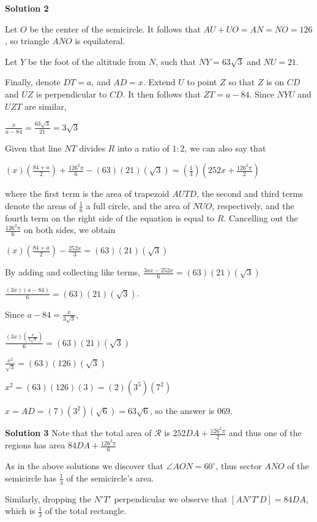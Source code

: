 \documentclass[a4paper,11pt]{article}
\begin{document}
\textbf{Solution 2}

Let $O$ be the center of the semicircle. It follows that $AU + UO = AN = NO = 126$, so triangle $ANO$ is equilateral.

Let $Y$ be the foot of the altitude from $N$, such that $NY = 63\sqrt{3}$ and $NU = 21$.

Finally, denote $DT = a$, and $AD = x$. Extend $U$ to point $Z$ so that $Z$ is on $CD$ and $UZ$ is perpendicular to $CD$. It then follows that $ZT = a-84$. Since $NYU$ and $UZT$ are similar,

$\frac {x}{a-84} = \frac {63\sqrt{3}}{21} = 3\sqrt{3}$

Given that line $NT$ divides $R$ into a ratio of $1:2$, we can also say that

$(x)(\frac{84+a}{2}) + \frac {126^2\pi}{6} - (63)(21)(\sqrt{3}) = (\frac{1}{3})(252x + \frac{126^2\pi}{2})$

where the first term is the area of trapezoid $AUTD$, the second and third terms denote the areas of $\frac{1}{6}$ a full circle, and the area of $NUO$, respectively, and the fourth term on the right side of the equation is equal to $R$. Cancelling out the $\frac{126^2\pi}{6}$ on both sides, we obtain

$(x)(\frac{84+a}{2}) - \frac{252x}{3} = (63)(21)(\sqrt{3})$

By adding and collecting like terms, $\frac{3ax - 252x}{6} = (63)(21)(\sqrt{3})$

$\frac{(3x)(a-84)}{6} = (63)(21)(\sqrt{3})$.

Since $a - 84 = \frac{x}{3\sqrt{3}}$,

$\frac {(3x)(\frac{x}{3\sqrt{3}})}{6} = (63)(21)(\sqrt{3})$

$\frac {x^2}{\sqrt{3}} = (63)(126)(\sqrt{3})$

$x^2 = (63)(126)(3) = (2)(3^5)(7^2)$

$x = AD = (7)(3^2)(\sqrt{6}) = 63\sqrt{6}$, so the answer is $\boxed{069}.$


\textbf{Solution 3}
Note that the total area of $\mathcal{R}$ is $252DA + \frac {126^2 \pi}{2}$ and thus one of the regions has area $84DA + \frac {126^2 \pi}{6}$

As in the above solutions we discover that $\angle AON = 60^\circ$, thus sector $ANO$ of the semicircle has $\frac{1}{3}$ of the semicircle's area.

Similarly, dropping the $N'T'$ perpendicular we observe that $[AN'T'D] = 84DA$, which is $\frac{1}{3}$ of the total rectangle.
\end{document}
